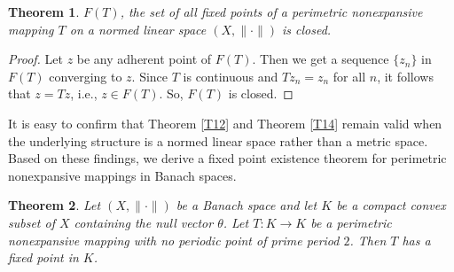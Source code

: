 \documentclass[11pt,reqno]{amsart}
\newtheorem{theorem}{Theorem}[section]
\theoremstyle{definition}
\newtheorem{Open Prob}[theorem]{Open Problem}
\theoremstyle{remark}
\numberwithin{equation}{section}
\begin{document}
\begin{theorem}\label{T32}
$F(T)$, the set of all fixed points of a perimetric nonexpansive mapping $T$ on a normed linear space $(X,\|\cdot\|)$ is closed.
\end{theorem}
\begin{proof}
Let $z$ be any adherent point of $F(T)$. Then we get a sequence $\{z_n\}$ in $F(T)$ converging to $z$. Since $T$ is continuous and $Tz_n=z_n$ for all $n$, it follows that $z=Tz$, i.e., $z\in F(T)$. So, $F(T)$ is closed.
\end{proof}

It is easy  to confirm that Theorem \eqref{T12} and Theorem \eqref{T14}  remain valid when the underlying structure is a normed linear space rather than a metric space. Based on these findings, we derive a fixed point existence theorem for perimetric nonexpansive mappings in Banach spaces.

\begin{theorem}\label{T33}
Let $(X,\|\cdot\|)$ be a Banach space and let $K$ be a compact convex subset of $X$ containing the null vector $\theta$. Let $T: K \to K$ be a perimetric nonexpansive mapping with no periodic point of prime period $2$. Then $T$ has a fixed point in $K$.
\end{theorem}
\end{document}
